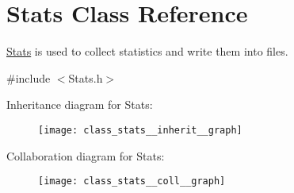 \hypertarget{class_stats}{}\section{Stats Class Reference}
\label{class_stats}


\hyperlink{class_stats}{Stats} is used to collect statistics and write them into files.  




{\ttfamily \#include $<$Stats.\+h$>$}



Inheritance diagram for Stats\+:
\nopagebreak
\begin{figure}[H]
\begin{center}
\leavevmode
\texttt{[image: class\_stats\_\_inherit\_\_graph]}
\end{center}
\end{figure}


Collaboration diagram for Stats\+:
\nopagebreak
\begin{figure}[H]
\begin{center}
\leavevmode
\texttt{[image: class\_stats\_\_coll\_\_graph]}
\end{center}
\end{figure}
